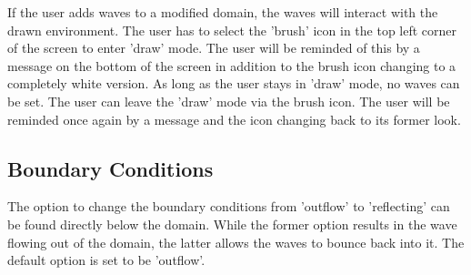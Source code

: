 \documentclass[11pt,a4paper]{article}
\begin{document}
If the user adds  waves to a modified domain, the waves will interact with the drawn environment.  The user has to select the 'brush' icon in the top left corner of the screen to  enter 'draw' mode. The user will be reminded of this by a message on the bottom of the screen in addition to the brush icon changing to a completely white version. As long as the user stays in 'draw' mode, no waves can be set. The user can leave the 'draw' mode via the brush icon. The user will be reminded once again by a message and the icon changing back to its former look.


\pagebreak
\subsection{Boundary Conditions}
The option to change the boundary conditions from 'outflow' to 'reflecting' can be found directly below the domain. While the former option results in the wave flowing out of the domain, the latter allows the waves to bounce back into it. The default option is set to be 'outflow'.
\end{document}
